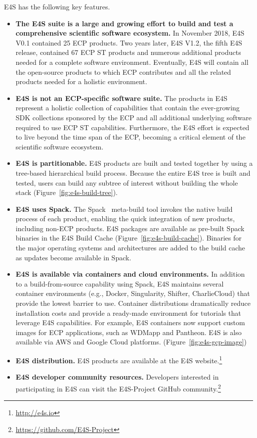 E4S has the following key features.
\begin{itemize}
	\item \textbf{The E4S suite is a large and growing effort to build and test a comprehensive scientific software ecosystem.} In November 2018, E4S V0.1 contained 25 ECP products.  Two years later, E4S V1.2, the fifth E4S release, contained 67 ECP ST products and numerous additional products needed for a complete software environment.  Eventually, E4S will contain all the open-source products to which ECP contributes and all the related products needed for a holistic environment.
	\item \textbf{E4S is not an ECP-specific software suite.}  The products in E4S represent a holistic collection of capabilities that contain the ever-growing SDK collections sponsored by the ECP and all additional underlying software required to use ECP ST capabilities.  Furthermore, the E4S effort is expected to live beyond the time span of the ECP, becoming a critical element of the scientific software ecosystem.
	\item \textbf{E4S is partitionable.} E4S products are built and tested together by using a tree-based hierarchical build process.  Because the entire E4S tree is built and tested, users can build any subtree of interest without building the whole stack (Figure~\ref{fig:e4s-build-tree}).
	\item \textbf{E4S uses Spack.} The Spack~\cite{gamblin+:ecp18-spack-tutorial} meta-build tool invokes the native build process of each product, enabling the quick integration of new products, including non-ECP products.  E4S packages are available as pre-built Spack binaries in the E4S Build Cache (Figure~\ref{fig:e4s-build-cache}).  Binaries for the major operating systems and architectures are added to the build cache as updates become available in Spack. 
	\item \textbf{E4S is available via containers and cloud environments.} In addition to a build-from-source capability using Spack, E4S maintains several container environments (e.g., Docker, Singularity, Shifter, CharlieCloud) that provide the lowest barrier to use.  Container distributions dramatically reduce installation costs and provide a ready-made environment for tutorials that leverage E4S capabilities.  For example, E4S containers now support custom images for ECP applications, such as WDMapp and Pantheon.  E4S is also available via AWS and Google Cloud platforms. (Figure~\ref{fig:e4s-gcp-image})
	\item \textbf{E4S distribution.} E4S products are available at the E4S website.\footnote{\url{http://e4s.io}}
	\item \textbf{E4S developer community resources.} Developers interested in participating in E4S can visit the E4S-Project GitHub community.\footnote{\url{https://github.com/E4S-Project}}	
\end{itemize}

